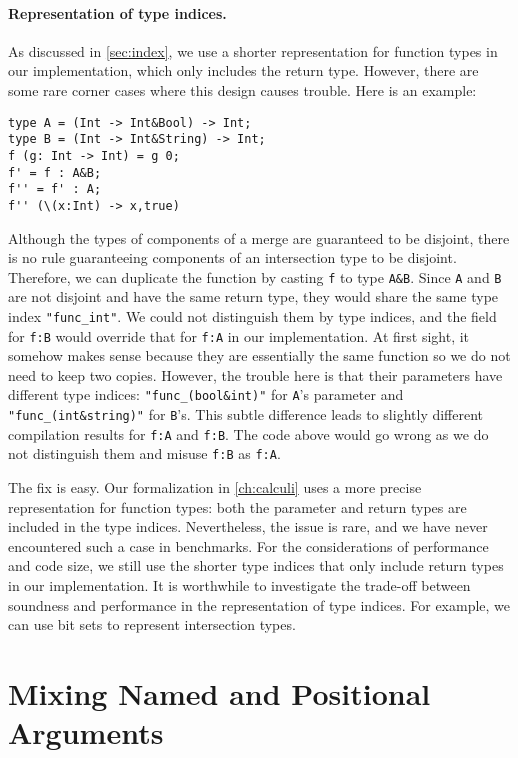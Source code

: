 \paragraph{Representation of type indices.}
As discussed in \autoref{sec:index}, we use a shorter representation for
function types in our implementation, which only includes the return type.
However, there are some rare corner cases where this design causes trouble. Here
is an example:
\begin{lstlisting}
type A = (Int -> Int&Bool) -> Int;
type B = (Int -> Int&String) -> Int;
f (g: Int -> Int) = g 0;
f' = f : A&B;
f'' = f' : A;
f'' (\(x:Int) -> x,true)
\end{lstlisting}
Although the types of components of a merge are guaranteed to be disjoint, there
is no rule guaranteeing components of an intersection type to be disjoint.
Therefore, we can duplicate the function by casting \lstinline{f} to type
\lstinline{A&B}. Since \lstinline{A} and \lstinline{B} are not disjoint and have
the same return type, they would share the same type index
\lstinline{"func_int"}. We could not distinguish them by type indices, and the
field for \lstinline{f:B} would override that for \lstinline{f:A} in our
implementation. At first sight, it somehow makes sense because they are
essentially the same function so we do not need to keep two copies. However, the
trouble here is that their parameters have different type indices:
\lstinline{"func_(bool&int)"} for \lstinline{A}'s parameter and
\lstinline{"func_(int&string)"} for \lstinline{B}'s. This subtle difference
leads to slightly different compilation results for \lstinline{f:A} and
\lstinline{f:B}. The code above would go wrong as we do not distinguish them and
misuse \lstinline{f:B} as \lstinline{f:A}.

The fix is easy. Our formalization in \autoref{ch:calculi} uses a more
precise representation for function types: both the parameter and return types
are included in the type indices. Nevertheless, the issue is rare, and we
have never encountered such a case in benchmarks. For the considerations of
performance and code size, we still use the shorter type indices that only
include return types in our implementation. It is worthwhile to investigate the
trade-off between soundness and performance in the representation of type
indices. For example, we can use bit sets to represent intersection types.

\section{Mixing Named and Positional Arguments}


